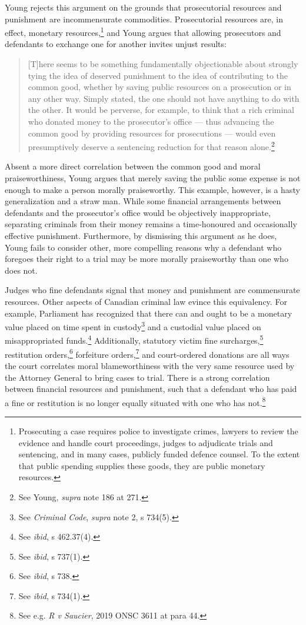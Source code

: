 Young rejects this argument on the grounds that prosecutorial resources and punishment are incommensurate commodities. Prosecutorial resources are, in effect, monetary resources,\footnote{Prosecuting a case requires police to investigate crimes, lawyers to review the evidence and handle court proceedings, judges to adjudicate trials and sentencing, and in many cases, publicly funded defence counsel. To the extent that public spending supplies these goods, they are public monetary resources.} and Young argues that allowing prosecutors and defendants to exchange one for another invites unjust results:

\begin{quote}
    \begin{singlespace}
    
    [T]here seems to be something fundamentally objectionable about strongly tying the idea of deserved punishment to the idea of contributing to the common good, whether by saving public resources on a prosecution or in any other way. Simply stated, the one should not have anything to do with the other. It would be perverse, for example, to think that a rich criminal who donated money to the prosecutor's office — thus advancing the common good by providing resources for prosecutions — would even presumptively deserve a sentencing reduction for that reason alone.\footnote{See Young, \textit{supra} note 186 at 271.}
    \end{singlespace}
\end{quote}
Absent a more direct correlation between the common good and moral praiseworthiness, Young argues that merely saving the public some expense is not enough to make a person morally praiseworthy. This example, however, is a hasty generalization and a straw man. While some financial arrangements between defendants and the prosecutor's office would be objectively inappropriate, separating criminals from their money remains a time-honoured and occasionally effective punishment. Furthermore, by dismissing this argument as he does, Young fails to consider other, more compelling reasons why a defendant who foregoes their right to a trial may be more morally praiseworthy than one who does not.

Judges who fine defendants signal that money and punishment are commensurate resources. Other aspects of Canadian criminal law evince this equivalency. For example, Parliament has recognized that there can and ought to be a monetary value placed on time spent in custody\footnote{See \textit{Criminal Code}, \textit{supra} note 2, s 734(5).} and a custodial value placed on misappropriated funds.\footnote{See \textit{ibid}, s 462.37(4).} Additionally, statutory victim fine surcharges,\footnote{See \textit{ibid}, s 737(1).} restitution orders,\footnote{See \textit{ibid}, s 738.} forfeiture orders,\footnote{See \textit{ibid}, s 734(1).} and court-ordered donations are all ways the court correlates moral blameworthiness with the very same resource used by the Attorney General to bring cases to trial. There is a strong correlation between financial resources and punishment, such that a defendant who has paid a fine or restitution is no longer equally situated with one who has not.\footnote{See e.g. \textit{R v Saucier}, 2019 ONSC 3611 at para 44.}

